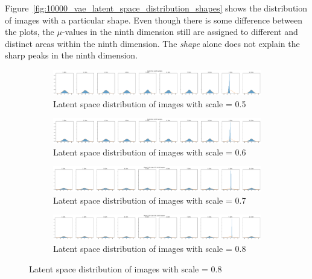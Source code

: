 Figure~\ref{fig:10000_vae_latent_space_distribution_shapes} shows the distribution of images with a particular shape.
Even though there is some difference between the plots, the $\mu$-values in the ninth dimension still are assigned to different and distinct areas within the ninth dimension.
The \textit{shape} alone does not explain the sharp peaks in the ninth dimension.

\begin{figure}
    \centering
    \begin{subfigure}{\textwidth}
        \centering
        \includegraphics[width=\textwidth]{images/latent_space_entanglement/vae_dsprites_lf_10000_dist_scale_0_5.png}
        \caption{Latent space distribution of images with scale = 0.5}
    \end{subfigure}
    \begin{subfigure}{\textwidth}
        \centering
        \includegraphics[width=\textwidth]{images/latent_space_entanglement/vae_dsprites_lf_10000_dist_scale_0_6.png}
        \caption{Latent space distribution of images with scale = 0.6}
    \end{subfigure}
    \begin{subfigure}{\textwidth}
        \centering
        \includegraphics[width=\textwidth]{images/latent_space_entanglement/vae_dsprites_lf_10000_dist_scale_0_7.png}
        \caption{Latent space distribution of images with scale = 0.7}
    \end{subfigure}
    \begin{subfigure}{\textwidth}
        \centering
        \includegraphics[width=\textwidth]{images/latent_space_entanglement/vae_dsprites_lf_10000_dist_scale_0_8.png}
        \caption{Latent space distribution of images with scale = 0.8}

\end{subfigure}
\end{figure}
